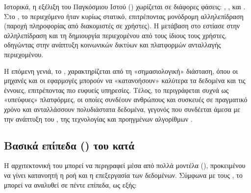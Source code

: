 Ιστορικά, η εξέλιξη του Παγκόσμιου Ιστού () χωρίζεται σε διάφορες φάσεις:
, ,  και . Στο , το περιεχόμενο
ήταν κυρίως στατικό, επιτρέποντας μονόδρομη αλληλεπίδραση (παροχή πληροφορίας από
διακομιστές σε χρήστες). Η μετάβαση στο  εστίασε στην αλληλεπίδραση και τη
δημιουργία περιεχομένου από τους ίδιους τους χρήστες, οδηγώντας στην ανάπτυξη κοινωνικών
δικτύων και πλατφορμών ανταλλαγής περιεχομένου.

Η επόμενη γενιά, το , χαρακτηρίζεται από τη «σημασιολογική» διάσταση, όπου οι
μηχανές και οι εφαρμογές μπορούν να «κατανοήσουν» καλύτερα τα δεδομένα και τις έννοιες,
επιτρέποντας πιο ευφυείς υπηρεσίες. Τέλος, το  περιγράφεται συχνά ως
«υπεύφυες» πλατφόρμες, οι οποίες συνδέουν ανθρώπους και συσκευές σε πραγματικό χρόνο
και ανταλλάσσουν πολυδιάστατα δεδομένα, γεγονός που συνδέεται άμεσα με την ανάπτυξη του
, της  τεχνολογίας και προηγμένων αλγορίθμων .

\subsection*{Βασικά επίπεδα () του  κατά }

Η αρχιτεκτονική του  μπορεί να περιγραφεί μέσα από πολλά μοντέλα (),
προκειμένου να γίνει κατανοητή η ροή και η επεξεργασία των δεδομένων. Σύμφωνα με τους
 \cite{atzori_internet_2010}, το  μπορεί να αναλυθεί σε πέντε επίπεδα, ως εξής:

